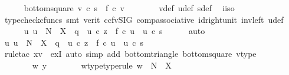 \begin{isabellebody}
\ \ \ \ \isamarkupfalse%
\ bottom{\isacharunderscore}{\kern0pt}square{\isacharcolon}{\kern0pt}\ {\isachardoublequoteopen}v\ {\isasymcirc}\isactrlsub c\ s\ {\isacharequal}{\kern0pt}\ f\ {\isasymcirc}\isactrlsub c\ v{\isachardoublequoteclose}\isanewline
\ \ \ \ \ \ \isamarkupfalse%
\ v{\isacharunderscore}{\kern0pt}def\ u{\isacharunderscore}{\kern0pt}def\ s{\isacharunderscore}{\kern0pt}def\ \isamarkupfalse%
\ i{\isacharunderscore}{\kern0pt}iso\isanewline
\ \ \ \ \ \ \isamarkupfalse%
\ {\isacharparenleft}{\kern0pt}typecheck{\isacharunderscore}{\kern0pt}cfuncs{\isacharcomma}{\kern0pt}\ smt\ {\isacharparenleft}{\kern0pt}verit{\isacharcomma}{\kern0pt}\ ccfv{\isacharunderscore}{\kern0pt}SIG{\isacharparenright}{\kern0pt}\ comp{\isacharunderscore}{\kern0pt}associative{}\ id{\isacharunderscore}{\kern0pt}right{\isacharunderscore}{\kern0pt}unit{}\ inv{\isacharunderscore}{\kern0pt}left\ u{\isacharunderscore}{\kern0pt}def{\isacharparenright}{\kern0pt}\isanewline
\ \ \ \ \isamarkupfalse%
\ {\isachardoublequoteopen}{\isasymexists}{\isacharbang}{\kern0pt}u{\isachardot}{\kern0pt}\ u\ {\isacharcolon}{\kern0pt}\ N\ {\isasymrightarrow}\ X\ {\isasymand}\ q\ {\isacharequal}{\kern0pt}\ u\ {\isasymcirc}\isactrlsub c\ z\ {\isasymand}\ f\ {\isasymcirc}\isactrlsub c\ u\ {\isacharequal}{\kern0pt}\ u\ {\isasymcirc}\isactrlsub c\ s{\isachardoublequoteclose}\isanewline
\ \ \ \ \isamarkupfalse%
\ auto\isanewline
\ \ \ \ \ \ \isamarkupfalse%
\ {\isachardoublequoteopen}{\isasymexists}u{\isachardot}{\kern0pt}\ u\ {\isacharcolon}{\kern0pt}\ N\ {\isasymrightarrow}\ X\ {\isasymand}\ q\ {\isacharequal}{\kern0pt}\ u\ {\isasymcirc}\isactrlsub c\ z\ {\isasymand}\ f\ {\isasymcirc}\isactrlsub c\ u\ {\isacharequal}{\kern0pt}\ u\ {\isasymcirc}\isactrlsub c\ s{\isachardoublequoteclose}\isanewline
\ \ \ \ \ \ \ \ \isamarkupfalse%
\ {\isacharparenleft}{\kern0pt}rule{\isacharunderscore}{\kern0pt}tac\ x{\isacharequal}{\kern0pt}v\ \ exI{\isacharcomma}{\kern0pt}\ auto\ simp\ add{\isacharcolon}{\kern0pt}\ bottom{\isacharunderscore}{\kern0pt}triangle\ bottom{\isacharunderscore}{\kern0pt}square\ v{\isacharunderscore}{\kern0pt}type{\isacharparenright}{\kern0pt}\isanewline
\ \ \ \ \isamarkupfalse%
\isanewline
\ \ \ \ \ \ \isamarkupfalse%
\ w\ y\isanewline
\ \ \ \ \ \ \isamarkupfalse%
\ w{\isacharunderscore}{\kern0pt}type{\isacharbrackleft}{\kern0pt}type{\isacharunderscore}{\kern0pt}rule{\isacharbrackright}{\kern0pt}{\isacharcolon}{\kern0pt}\ {\isachardoublequoteopen}w\ {\isacharcolon}{\kern0pt}\ N\ {\isasymrightarrow}\ X{\isachardoublequoteclose}\isanewline

\end{isabellebody}
